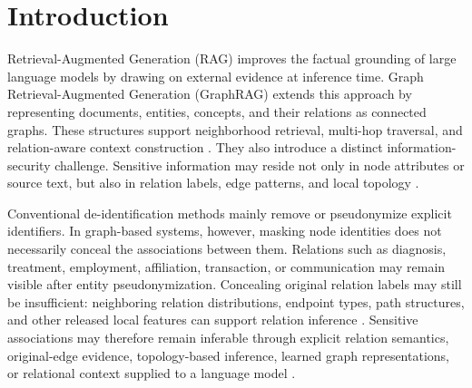 \documentclass[preprint,12pt]{elsarticle}
\begin{document}
\section{Introduction}
Retrieval-Augmented Generation (RAG) improves the factual grounding of large language models by drawing on external evidence at inference time. Graph Retrieval-Augmented Generation (GraphRAG) extends this approach by representing documents, entities, concepts, and their relations as connected graphs. These structures support neighborhood retrieval, multi-hop traversal, and relation-aware context construction \cite{ref14_hu_2025a,ref18_kim_2026,ref19_li_2025,ref30_osipjan_2025,ref31_peng_2026,ref34_wang_2024,ref35_wu_2025,ref40_yu_2026}. They also introduce a distinct information-security challenge. Sensitive information may reside not only in node attributes or source text, but also in relation labels, edge patterns, and local topology \cite{ref07_fu_2025,ref10_he_2021,ref13_hu_2024,ref15_hu_2025b,ref32_qiu_2023,ref41_yuan_2024,ref45_zhang_2022,ref46_zhu_2026}.

Conventional de-identification methods mainly remove or pseudonymize explicit identifiers. In graph-based systems, however, masking node identities does not necessarily conceal the associations between them. Relations such as diagnosis, treatment, employment, affiliation, transaction, or communication may remain visible after entity pseudonymization. Concealing original relation labels may still be insufficient: neighboring relation distributions, endpoint types, path structures, and other released local features can support relation inference \cite{ref07_fu_2025,ref10_he_2021,ref20_li_2023,ref41_yuan_2024,ref45_zhang_2022,ref43_zhang_2023}. Sensitive associations may therefore remain inferable through explicit relation semantics, original-edge evidence, topology-based inference, learned graph representations, or relational context supplied to a language model \cite{ref02_annamalai_2024,ref05_choi_2025,ref09_he_2025,ref12_hu_2022,ref16_jia_2026,ref29_ning_2026,ref37_xiang_2025,ref42_zeng_2025}.
\end{document}
